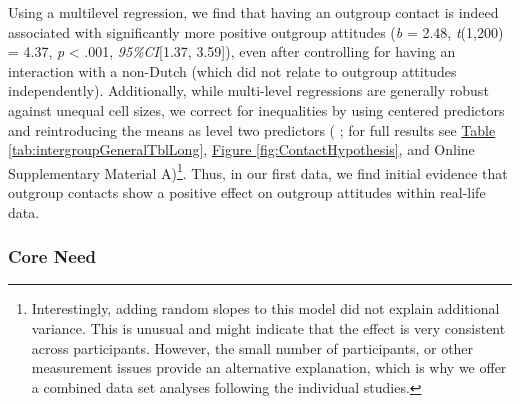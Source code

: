 \documentclass[man, 12pt, a4paper, mask]{apa7}
\theoremstyle{break}
\theoremstyle{plain}
\newcommand{\fgrref}[2][]{\hyperref[#2]{Figure \ref*{#2}#1}}
\newcommand{\tblref}[2][]{\hyperref[#2]{Table \ref*{#2}#1}}
\providecommand{\DIFaddbegin}{} %
\providecommand{\DIFaddend}{} %
\providecommand{\DIFdelbegin}{} %
\providecommand{\DIFdelend}{} %
\newcommand{\DIFscaledelfig}{0.5}
\newlength{\DIFdelgraphicswidth} %
\newlength{\DIFdelgraphicsheight} %
\newcommand{\DIFaddincludegraphics}[2][]{{\color{blue}\fbox{\DIFOincludegraphics[#1]{#2}}}} %
\newcommand{\DIFdelincludegraphics}[2][]{%
\sbox{\DIFdelgraphicsbox}{\DIFOincludegraphics[#1]{#2}}%
\settoboxwidth{\DIFdelgraphicswidth}{\DIFdelgraphicsbox} %
\settoboxtotalheight{\DIFdelgraphicsheight}{\DIFdelgraphicsbox} %
\scalebox{\DIFscaledelfig}{%
\parbox[b]{\DIFdelgraphicswidth}{\usebox{\DIFdelgraphicsbox}\\[-\baselineskip] \rule{\DIFdelgraphicswidth}{0em}}\llap{\resizebox{\DIFdelgraphicswidth}{\DIFdelgraphicsheight}{%
\setlength{\unitlength}{\DIFdelgraphicswidth}%
\begin{picture}(1,1)%
\thicklines\linethickness{2pt} %
{\color[rgb]{1,0,0}\put(0,0){\framebox(1,1){}}}%
{\color[rgb]{1,0,0}\put(0,0){\line( 1,1){1}}}%
{\color[rgb]{1,0,0}\put(0,1){\line(1,-1){1}}}%
\end{picture}%
}\hspace*{3pt}}} %
} %
\DeclareRobustCommand{\DIFaddbegin}{\DIFOaddbegin \let\includegraphics\DIFaddincludegraphics} %
\DeclareRobustCommand{\DIFaddend}{\DIFOaddend \let\includegraphics\DIFOincludegraphics} %
\DeclareRobustCommand{\DIFdelbegin}{\DIFOdelbegin \let\includegraphics\DIFdelincludegraphics} %
\DeclareRobustCommand{\DIFdelend}{\DIFOaddend \let\includegraphics\DIFOincludegraphics} %
\begin{document}
Using a multilevel regression, we find that having an outgroup contact
is indeed associated with significantly more positive outgroup attitudes
(\textit{b} = 2.48, \textit{t}(1,200) = 4.37, \textit{p} \textless{}
.001, \textit{95\%CI}{[}1.37, 3.59{]}), even after controlling for
having an interaction with a non-Dutch (which did not relate to outgroup
attitudes independently). Additionally, while multi-level regressions
are generally robust against unequal cell sizes, we correct for
inequalities by using centered predictors and reintroducing the means as
level two predictors (\DIFdelbegin %
\DIFdelend \DIFaddbegin \citealp{yaremych2021a}\DIFaddend ; for full results see
\tblref{tab:intergroupGeneralTblLong}, \fgrref{fig:ContactHypothesis},
and Online Supplementary Material
A)\footnote{Interestingly, adding random slopes to this model did not explain additional variance. This is unusual and might indicate that the effect is very consistent across participants. However, the small number of participants, or other measurement issues provide an alternative explanation, which is why we offer a combined data set analyses following the individual studies.}.
Thus, in our first data, we find initial evidence that outgroup contacts
show a positive effect on outgroup attitudes within real-life data.

\subsubsection{Core Need}
\end{document}
